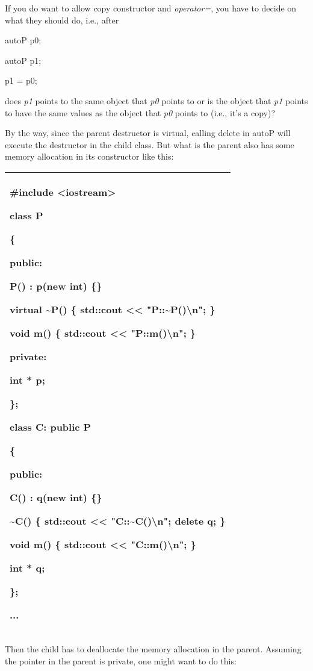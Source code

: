 \documentclass[
]{article}
\begin{document}
If you do want to allow copy constructor and \emph{operator=}, you have
to decide on what they should do, i.e., after

autoP p0;

autoP p1;

p1 = p0;

does \emph{p1} points to the same object that \emph{p0} points to or is
the object that \emph{p1} points to have the same values as the object
that \emph{p0} points to (i.e., it's a copy)?

By the way, since the parent destructor is virtual, calling delete in
autoP will execute the destructor in the child class. But what is the
parent also has some memory allocation in its constructor like this:

\begin{longtable}[]{@{}l@{}}
\toprule
\endhead
\begin{minipage}[t]{0.97\columnwidth}\raggedright
\#include \textless iostream\textgreater{}

class P

\{

public:

P() : p(new int) \{\}

\textbf{ }virtual \textasciitilde P() \{ std::cout \textless\textless{}
"P::\textasciitilde P()\textbackslash n"; \}

void m() \{ std::cout \textless\textless{} "P::m()\textbackslash n"; \}

private:

int * p;

\};

class C: public P

\{

public:

C() : q(new int) \{\}

\textasciitilde C() \{ std::cout \textless\textless{}
"C::\textasciitilde C()\textbackslash n"; delete q; \}

void m() \{ std::cout \textless\textless{} "C::m()\textbackslash n"; \}

int * q;

\};

...\strut
\end{minipage}\tabularnewline
\bottomrule
\end{longtable}

Then the child has to deallocate the memory allocation in the parent.
Assuming the pointer in the parent is private, one might want to do
this:
\end{document}
